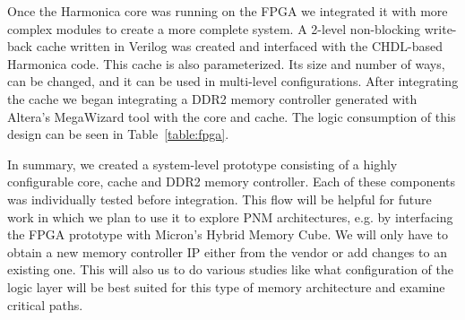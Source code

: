 Once the Harmonica core was running on the FPGA we integrated it with more complex modules to create a more complete system.
A 2-level non-blocking write-back cache written in Verilog was created and interfaced with the CHDL-based Harmonica code.
This cache is also parameterized.
Its size and number of ways, can be changed, and it can be used in multi-level configurations.
After integrating the cache we began integrating a DDR2 memory controller generated with Altera's MegaWizard tool with the core and cache.
The logic consumption of this design can be seen in Table~\ref{table:fpga}.

In summary, we created a system-level prototype consisting of a highly configurable core, cache and DDR2 memory controller.
Each of these components was individually tested before integration.
This flow will be helpful for future work in which we plan to use it to explore PNM architectures, e.g. by interfacing the FPGA prototype with Micron's Hybrid Memory Cube.
We will only have to obtain a new memory controller IP either from the vendor or add changes to an existing one.
This will also us to do various studies like what configuration of the logic layer will be best suited for this type of memory architecture and examine critical paths.
